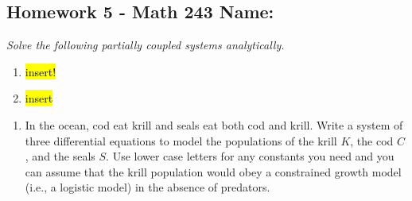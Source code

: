 \documentclass[10pt]{article}
\begin{document}
\pagestyle{empty}
\subsection*{Homework 5 - Math 243 \hfill Name: \underline{\hspace*{2in}}}


\noindent


\noindent
\textit{Solve the following partially coupled systems analytically.}

\begin{multicols}{2}
\begin{enumerate}
\setcounter{enumi}{\theenumCount}
\item \hl{insert!}


\item \hl{insert}

\setcounter{enumCount}{\theenumi}
\end{enumerate} 
\end{multicols}
\vfill




\begin{enumerate}
\setcounter{enumi}{\theenumCount}

\item In the ocean, cod eat krill and seals eat both cod and krill.  Write a system of three differential equations to model the populations of the krill $K$, the cod $C$, and the seals $S$.  Use lower case letters for any constants you need and you can assume that the krill population would obey a constrained growth model (i.e., a logistic model) in the absence of predators. 
\vfill


\setcounter{enumCount}{\theenumi}
\end{enumerate}
\end{document}
